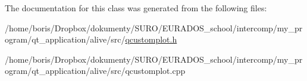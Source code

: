 The documentation for this class was generated from the following files\-:\begin{DoxyCompactItemize}
\item 
/home/boris/\-Dropbox/dokumenty/\-S\-U\-R\-O/\-E\-U\-R\-A\-D\-O\-S\-\_\-school/intercomp/my\-\_\-program/qt\-\_\-application/alive/src/\hyperlink{qcustomplot_8h}{qcustomplot.\-h}\item 
/home/boris/\-Dropbox/dokumenty/\-S\-U\-R\-O/\-E\-U\-R\-A\-D\-O\-S\-\_\-school/intercomp/my\-\_\-program/qt\-\_\-application/alive/src/qcustomplot.\-cpp\end{DoxyCompactItemize}
